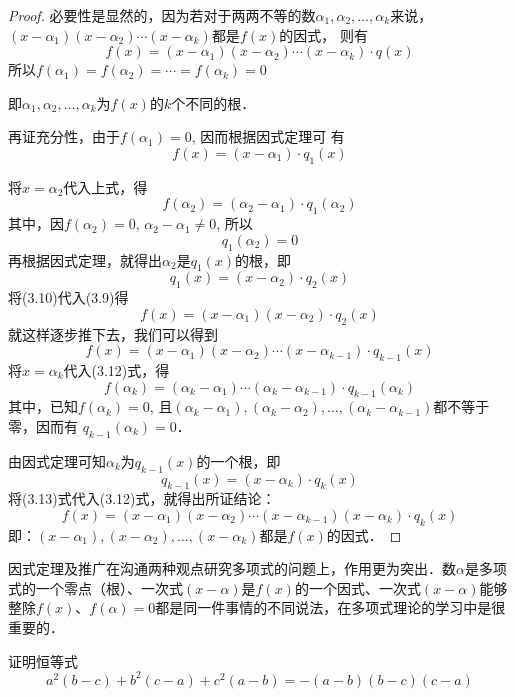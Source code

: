 \begin{proof}
必要性是显然的，因为若对于两两不等的数$\alpha_1,\alpha_2,\ldots,\alpha_k$来说，$(x-\alpha_1)(x-\alpha_2)\cdots(x-\alpha_k)$都是$f(x)$的因式，
则有    
\[f(x)=(x-\alpha_1)(x-\alpha_2)\cdots(x-\alpha_k)\cdot q(x)\]
所以$f(\alpha_1)=f(\alpha_2) =\cdots=f(\alpha_k)=0$

即$\alpha_1,\alpha_2,\ldots,\alpha_k$为$f(x)$的$k$个不同的根．

再证充分性，由于$f(\alpha_1)=0$, 因而根据因式定理可
有
\begin{equation}
    f (x) = (x-\alpha_1) \cdot q_1 (x)
\end{equation}

将$x=\alpha_2$代入上式，得
\[f (\alpha_2) = (\alpha_2-\alpha_1) \cdot q_1(\alpha_2)\]
其中，因$f(\alpha_2)=0$, $\alpha_2-\alpha_1\ne 0$, 所以
\[q_1(\alpha_2)=0\]
再根据因式定理，就得出$\alpha_2$是$q_1(x)$的根，即
\begin{equation}
q_1(x)=(x-\alpha_2)\cdot q_2(x)
\end{equation}
将(3.10)代入(3.9)得
\begin{equation}
    f (x) = (x-\alpha_1) (x-\alpha_2)\cdot q_2(x)
\end{equation}
就这样逐步推下去，我们可以得到
\begin{equation}
    f (x) = (x-\alpha_1 ) (x-\alpha_2)\cdots(x-\alpha_{k-1})\cdot q_{k-1}(x) 
\end{equation}
将$x=\alpha_k$代入(3.12)式，得
\[f (\alpha_k) = (\alpha_k -\alpha_1)\cdots (\alpha_k-\alpha_{k-1})\cdot q_{k-1}(\alpha_k)\]
其中，已知$f(\alpha_k)=0$, 且$(\alpha_k-\alpha_1),(\alpha_{k}-\alpha_2),\ldots,(\alpha_k-\alpha_{k-1})$都不等于零，因而有 $q_{k-1}(\alpha_k)=0$．

由因式定理可知$\alpha_k$为$q_{k-1}(x)$的一个根，即
\begin{equation}
    q_{k-1}(x)=(x-\alpha_k)\cdot q_{k}(x)
\end{equation}
将(3.13)式代入(3.12)式，就得出所证结论：
\[f(x)=(x-\alpha_1)(x-\alpha_2)\cdots(x-\alpha_{k-1})(x-\alpha_k)\cdot q_k(x)\]
即：$(x-\alpha_1),(x-\alpha_2),\ldots,(x-\alpha_k)$都是$f(x)$的因式．
\end{proof}

因式定理及推广在沟通两种观点研究多项式的问题上，作用更为突出．数$\alpha$是多项式的一个零点（根）、一次式$(x-\alpha)$是$f(x)$的一个因式、一次式$(x-\alpha)$能够整除$f(x)$、$f(\alpha)=0$都是同一件事情的不同说法，在多项式理论的学习中是很重要的．


\begin{example}
证明恒等式
\[a^2(b-c)+b^2(c-a)+c^2(a-b)=-(a-b)(b-c)(c-a)\]
\end{example}

